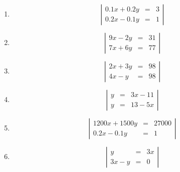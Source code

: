 \documentclass[%
11pt,%
twoside,%
titlepage,%
german,%
]{scrartcl}
\begin{document}
\begin{enumerate}
\begin{enumerate}
  \item 
    \begin{displaymath}
      \left| 
        \begin{array}{rcl}
         0.1x + 0.2y & = & 3 \\
         0.2x - 0.1y & = & 1
        \end{array} \right|
    \end{displaymath}

  \item 
    \begin{displaymath}
      \left| 
        \begin{array}{rcl}
         9x-2y & = & 31 \\
         7x+6y & = & 77
        \end{array} \right|
    \end{displaymath}

  \item 
    \begin{displaymath}
      \left| 
        \begin{array}{rcl}
         2x+3y & = & 98 \\
         4x-y & = & 98
        \end{array} \right|
    \end{displaymath}

  \item 
    \begin{displaymath}
      \left| 
        \begin{array}{rcl}
         y & = & 3x-11 \\
         y & = & 13-5x
        \end{array} \right|
    \end{displaymath}

  \item 
    \begin{displaymath}
      \left| 
        \begin{array}{rcl}
         1200x + 1500y & = & 27000 \\
         0.2x-0.1y & = & 1
        \end{array} \right|
    \end{displaymath}

  \item 
    \begin{displaymath}
      \left| 
        \begin{array}{rcl}
         y & = & 3x \\
         3x-y & = & 0
        \end{array} \right|
    \end{displaymath}


\end{enumerate}
\end{enumerate}
\end{document}
